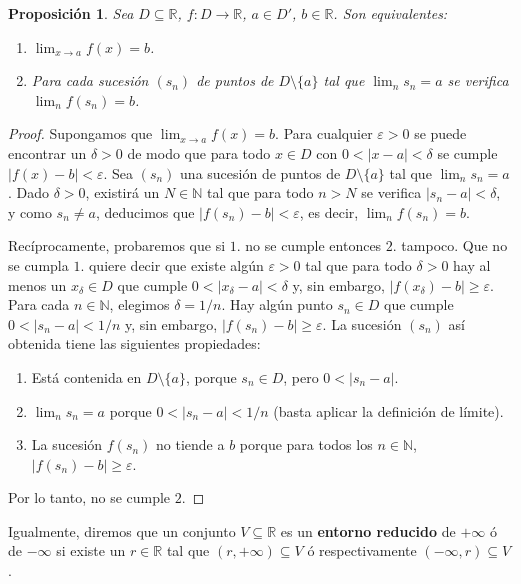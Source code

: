 \documentclass[12pt]{article}
\newtheorem{proposition}[theorem]{Proposición}
\begin{document}
\begin{proposition}\label{eq:limsuc} Sea $D \subseteq \mathbb{R}$, $f \colon D \longrightarrow \mathbb{R}$, $a \in D'$, $b \in \mathbb{R}$. Son equivalentes: 
\begin{enumerate}
\item $\lim_{x\rightarrow a} f(x) = b$.
\item Para cada sucesión $(s_n)$ de puntos de $D \setminus \lbrace a \rbrace $ tal que $\lim_n s_n = a$ se verifica $\lim_nf(s_n) = b$.
\end{enumerate}
\end{proposition}
\begin{proof}
Supongamos que $\lim_{x \rightarrow a} f(x) = b$. Para cualquier $\varepsilon >0$ se puede encontrar un $\delta >0$ de modo que para todo $x \in D$ con $0 < |x-a|< \delta$ se cumple $|f(x) -b | < \varepsilon$. Sea $(s_n)$ una sucesión de puntos de $D \setminus \lbrace a \rbrace$ tal que $\lim_n s_n = a$. Dado $\delta >0$, existirá un $N \in \mathbb{N}$ tal que para todo $n > N$ se verifica $|s_n-a | < \delta$, y como $s_n \neq a$, deducimos que $|f(s_n) -b | < \varepsilon$, es decir, $\lim_n f(s_n) = b$.

Recíprocamente, probaremos que si $1.$ no se cumple entonces $2.$ tampoco. Que no se cumpla $1.$ quiere decir que existe algún $\varepsilon >0$ tal que para todo $\delta >0$ hay al menos un $x_\delta \in D$ que cumple $0 < |x_\delta - a | < \delta$ y, sin embargo, $|f(x_\delta)-b | \geq \varepsilon$.
Para cada $n \in \mathbb{N}$, elegimos $\delta = 1/n$. Hay algún punto $s_n \in D$ que cumple $0 < |s_n -a| < 1/n$ y, sin embargo, $|f(s_n)-b | \geq \varepsilon$. La sucesión $(s_n)$ así obtenida tiene las siguientes propiedades: 
\begin{enumerate}
\item Está contenida en $D \setminus \lbrace a \rbrace$, porque $s_n \in D$, pero $0< |s_n -a|$. 
\item $\lim_n s_n=a$ porque $0 < |s_n-a|<1/n$ (basta aplicar la definición de límite).
\item La sucesión $f(s_n)$ no tiende a $b$ porque para todos los $n \in \mathbb{N}$, $|f(s_n)-b| \geq \varepsilon$.
\end{enumerate}
Por lo tanto, no se cumple $2.$
\end{proof}

Igualmente, diremos que un conjunto $V \subseteq \mathbb{R}$ es un \textbf{entorno reducido} de $+ \infty$ ó de $-\infty$ si existe un $r \in \mathbb{R}$ tal que $(r, + \infty) \subseteq V$ ó respectivamente $(- \infty, r) \subseteq V$.
\end{document}
